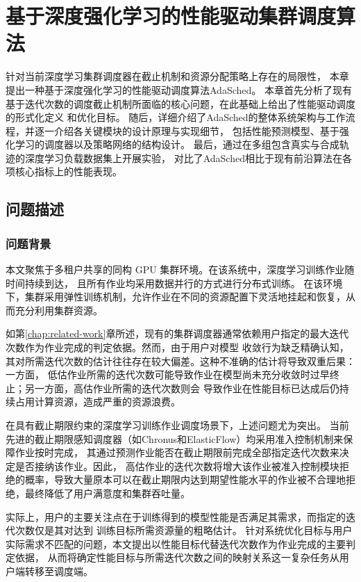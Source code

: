 
\chapter{基于深度强化学习的性能驱动集群调度算法}\label{chap:adasched}

针对当前深度学习集群调度器在截止机制和资源分配策略上存在的局限性，
本章提出一种基于深度强化学习的性能驱动调度算法AdaSched。
本章首先分析了现有基于迭代次数的调度截止机制所面临的核心问题，在此基础上给出了性能驱动调度的形式化定义
和优化目标。
随后，详细介绍了AdaSched的整体系统架构与工作流程，并逐一介绍各关键模块的设计原理与实现细节，
包括性能预测模型、基于强化学习的调度器以及策略网络的结构设计。
最后，通过在多组包含真实与合成轨迹的深度学习负载数据集上开展实验，
对比了AdaSched相比于现有前沿算法在各项核心指标上的性能表现。

\section{问题描述}\label{sec:problem}

\subsection{问题背景}\label{subsec:problem-bg}

本文聚焦于多租户共享的同构 GPU 集群环境。在该系统中，深度学习训练作业随时间持续到达，
且所有作业均采用数据并行的方式进行分布式训练。
在该环境下，集群采用弹性训练机制，允许作业在不同的资源配置下灵活地挂起和恢复，从而充分利用集群资源。

如第\ref{chap:related-work}章所述，现有的集群调度器通常依赖用户指定的最大迭代次数作为作业完成的判定依据。然而，由于用户对模型
收敛行为缺乏精确认知，其对所需迭代次数的估计往往存在较大偏差。这种不准确的估计将导致双重后果：一方面，
低估作业所需的迭代次数可能导致作业在模型尚未充分收敛时过早终止；另一方面，高估作业所需的迭代次数则会
导致作业在性能目标已达成后仍持续占用计算资源，造成严重的资源浪费。

在具有截止期限约束的深度学习训练作业调度场景下，上述问题尤为突出。
当前先进的截止期限感知调度器（如Chronus和ElasticFlow）均采用准入控制机制来保障作业按时完成，
其通过预测作业能否在截止期限前完成全部指定迭代次数来决定是否接纳该作业。因此，
高估作业的迭代次数将增大该作业被准入控制模块拒绝的概率，导致大量原本可以在截止期限内达到期望性能水平的作业被不合理地拒
绝，最终降低了用户满意度和集群吞吐量。

实际上，用户的主要关注点在于训练得到的模型性能是否满足其需求，而指定的迭代次数仅是其对达到
训练目标所需资源量的粗略估计。
针对系统优化目标与用户实际需求不匹配的问题，本文提出以性能目标代替迭代次数作为作业完成的主要判定依据，
从而将确定性能目标与所需迭代次数之间的映射关系这一复杂任务从用户端转移至调度端。

